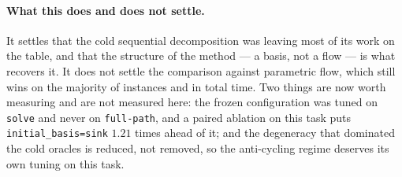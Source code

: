 \paragraph{What this does and does not settle.} It settles that the cold
sequential decomposition was leaving most of its work on the table, and that the
structure of the method --- a basis, not a flow --- is what recovers it. It does
not settle the comparison against parametric flow, which still wins on the
majority of instances and in total time. Two things are now worth measuring and
are not measured here: the frozen configuration was tuned on \texttt{solve} and
never on \texttt{full-path}, and a paired ablation on this task puts
\texttt{initial\_basis=sink} $1.21$ times ahead of it; and the degeneracy that
dominated the cold oracles is reduced, not removed, so the anti-cycling regime
deserves its own tuning on this task.
